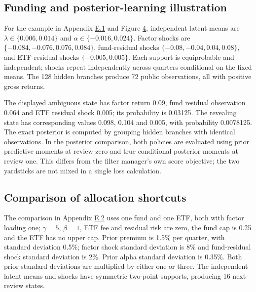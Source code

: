 \documentclass[11pt]{article}
\begin{document}
\subsection{Funding and posterior-learning illustration}\label{sec:C.4}

For the example in Appendix \hyperref[sec:E.1]{E.1} and Figure \hyperref[fig:4]{4}, independent latent means are \(\lambda\in\{0.006,0.014\}\) and \(\alpha\in\{-0.016,0.024\}\). Factor shocks are \(\{-0.084,-0.076,0.076,0.084\}\), fund-residual shocks \(\{-0.08,-0.04,0.04,0.08\}\), and ETF-residual shocks \(\{-0.005,0.005\}\). Each support is equiprobable and independent; shocks repeat independently across quarters conditional on the fixed means. The 128 hidden branches produce 72 public observations, all with positive gross returns.

The displayed ambiguous state has factor return 0.09, fund residual observation 0.064 and ETF residual shock 0.005; its probability is 0.03125. The revealing state has corresponding values 0.098, 0.104 and 0.005, with probability 0.0078125. The exact posterior is computed by grouping hidden branches with identical observations. In the posterior comparison, both policies are evaluated using prior predictive moments at review zero and true conditional posterior moments at review one. This differs from the filter manager's own score objective; the two yardsticks are not mixed in a single loss calculation.

\subsection{Comparison of allocation shortcuts}\label{sec:C.5}

The comparison in Appendix \hyperref[sec:E.2]{E.2} uses one fund and one ETF, both with factor loading one; \(\gamma=5\), \(\beta=1\), ETF fee and residual risk are zero, the fund cap is 0.25 and the ETF has no upper cap. Prior premium is 1.5\% per quarter, with standard deviation 0.5\%; factor shock standard deviation is 8\% and fund-residual shock standard deviation is 2\%. Prior alpha standard deviation is 0.35\%. Both prior standard deviations are multiplied by either one or three. The independent latent means and shocks have symmetric two-point supports, producing 16 next-review states.
\end{document}
